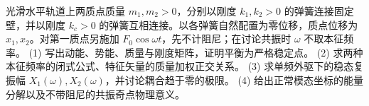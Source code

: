 光滑水平轨道上两质点质量 \(m_1,m_2>0\)，分别以刚度 \(k_1,k_2>0\) 的弹簧连接固定壁，并以刚度 \(k_c>0\) 的弹簧互相连接。以各弹簧自然配置为零位移，质点位移为 \(x_1,x_2\)。对第一质点另施加 \(F_0\cos\omega t\)，先不计阻尼；在讨论共振时 \(\omega\) 不取本征频率。
(1) 写出动能、势能、质量与刚度矩阵，证明平衡为严格稳定点。
(2) 求两种本征频率的闭式公式、特征矢量的质量加权正交关系。
(3) 求单频外驱下的稳态复振幅 \(X_1(\omega),X_2(\omega)\)，并讨论耦合趋于零的极限。
(4) 给出正常模态坐标的能量分解以及不带阻尼的共振奇点物理意义。

